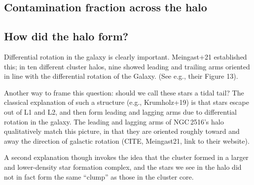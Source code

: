 \documentclass[12pt,twocolumn,tighten]{aastex63}
\begin{document}

\subsection{Contamination fraction across the halo}


\subsection{How did the halo form?}
\label{subsec:origin}

Differential rotation in the galaxy is clearly important. Meingast+21
established this; in ten different cluster halos, nine showed leading
and trailing arms oriented in line with the differential rotation of
the Galaxy.
(See e.g., their Figure 13).


Another way to frame this question: should we call these stars a tidal
tail?
The classical explanation of such a structure (e.g., Krumholz+19) is
that stars escape out of L1 and L2, and then form leading and lagging
arms due to differential rotation in the galaxy.
The leading and lagging arms of NGC\,2516's halo qualitatively
match this picture, in that they are oriented roughly toward and away
the direction of galactic rotation (CITE, Meingast21, link to their
website).

A second explanation though invokes
the idea that the cluster formed in a larger and lower-density star
formation complex, and the stars we see in the halo did not in fact
form the same ``clump'' as those in the cluster core.
\end{document}
